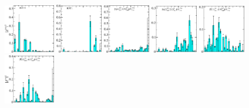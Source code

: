 \begin{figure}[H]
    \includegraphics[width=0.1975\textwidth]{figures/sigmas/g2u/zfactors/zfactor_isotriplet-S-1-P000-G2u_1-ROT-0.pdf}
    \includegraphics[width=0.18\textwidth]{figures/sigmas/g2u/zfactors/zfactor_isotriplet-S-1-P000-G2u_1-ROT-1.pdf}
    \includegraphics[width=0.18\textwidth]{figures/sigmas/g2u/zfactors/zfactor_isotriplet_eta_sigma-G2u_1-P001-A2p-SS_1-P00-1-G2-SS_0.pdf}
    \includegraphics[width=0.18\textwidth]{figures/sigmas/g2u/zfactors/zfactor_isotriplet_eta_sigma-G2u_1-P011-A2p-SS_0-P0-1-1-G-SS_1.pdf}
    \includegraphics[width=0.18\textwidth]{figures/sigmas/g2u/zfactors/zfactor_isotriplet_kbar_delta-G2u_1-P001-A2-SS_1-P00-1-G2-SS_0.pdf}\\
    \includegraphics[width=0.1975\textwidth]{figures/sigmas/g2u/zfactors/zfactor_isotriplet_kbar_delta-G2u_1-P011-A2-SS_0-P0-1-1-G-SS_0.pdf}

\end{figure}
